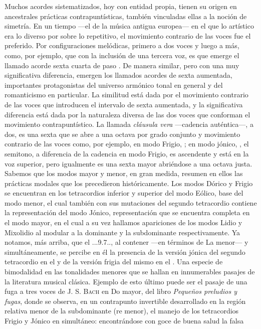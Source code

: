 \documentclass[a4paper,10pt]{article}
\begin{document}
\begin{multicols}{2}
Muchos acordes sistematizados, hoy con entidad propia, tienen su origen en ancestrales prácticas contrapuntísticas, también vinculadas ellas a la noción de simetría. En un tiempo ---el de la música antigua europea--- en el que lo artístico era lo diverso por sobre lo repetitivo, el movimiento contrario de las voces fue el preferido. Por configuraciones melódicas, primero a dos voces y luego a más, como, por ejemplo,  que con la inclusión de una tercera voz, es que emerge el llamado acorde sexta cuarta de paso \hbox{.} De manera similar, pero con una muy significativa diferencia, emergen los llamados acordes de sexta aumentada, importantes protagonistas del universo armónico tonal en general y del romanticismo en particular. La similitud está dada por el movimiento contrario de las voces que introducen el intervalo de sexta aumentada, y la significativa diferencia está dada por la naturaleza diversa de las dos voces que conforman el movimiento contrapuntístico. La llamada \emph{cláusula vera} ---cadencia auténtica---, a dos, es una sexta que se abre a una octava por grado conjunto y movimiento contrario de las voces como, por ejemplo, en modo Frigio, \hbox{;} en modo jónico, \hbox{,} el semitono, a diferencia de la cadencia en modo Frigio, es ascendente y está en la voz superior, pero igualmente es una sexta mayor abriéndose a una octava justa. Sabemos que los modos mayor y menor, en gran medida, resumen en ellos las prácticas modales que los precedieron históricamente. Los modos Dórico y Frigio se encuentran en los tetracordios inferior y superior del modo Eólico, base del modo menor, el cual también con sus mutaciones del segundo tetracordio contiene la representación del modo Jónico, representación que se encuentra completa en el modo mayor, en el cual a su vez hallamos apariciones de los modos Lidio y Mixolidio al modular a la dominante y la subdominante respectivamente. Ya notamos, más arriba, que el \acorde.\Dohne..9\bemoltxt.7.., al contener ---en términos de La menor---  y  simultáneamente, se percibe en él la presencia de la versión jónica del segundo tetracordio en el  y de la versión frigia del mismo en el . Una especie de bimodalidad en las tonalidades menores que se hallan en innumerables pasajes de la literatura musical clásica. Ejemplo de esto último puede ser el pasaje de una fuga a tres voces de \textsc{J. S. Bach} en Do mayor, del libro \emph{Pequeños preludios y fugas}, donde se observa, en un contrapunto invertible desarrollado en la región relativa menor de la subdominante (re menor), el manejo de los tetracordios Frigio y Jónico en simultáneo:  encontrándose con goce de buena salud la falsa 
\end{multicols}
\end{document}

